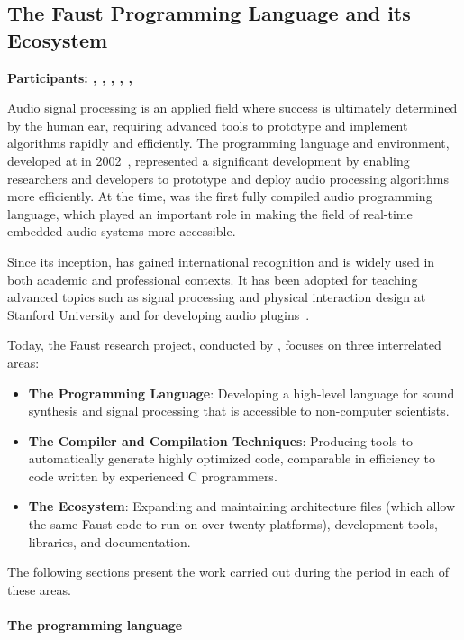 \subsection{The Faust Programming Language and its Ecosystem} {\bf Participants: \florent, \stephane, \romain,  \yann, \tanguy, \christine}


Audio signal processing is an applied field where success is ultimately determined by the human ear, requiring advanced tools to prototype and implement algorithms rapidly and efficiently. The \F{} programming language and environment, developed at \gramecncm in 2002~\cite{orlarey2002}, represented a significant development by enabling researchers and developers to prototype and deploy audio processing algorithms more efficiently. At the time, \F{} was the first fully compiled audio programming language, which played an important role in making the field of real-time embedded audio systems more accessible.  

Since its inception, \F{} has gained international recognition and is widely used in both academic and professional contexts. It has been adopted for teaching advanced topics such as signal processing and physical interaction design at Stanford University and for developing audio plugins~\cite{faustLibraries2019}.  

Today, the Faust research project, conducted by \projectname, focuses on three interrelated areas:  
\begin{itemize}
    \item \textbf{The Programming Language}: Developing a high-level language for sound synthesis and signal processing that is accessible to non-computer scientists.
    \item \textbf{The Compiler and Compilation Techniques}: Producing tools to automatically generate highly optimized code, comparable in efficiency to code written by experienced C programmers.
    \item \textbf{The Ecosystem}: Expanding and maintaining architecture files (which allow the same Faust code to run on over twenty platforms), development tools, libraries, and documentation.
\end{itemize}  

The following sections present the work carried out during the period in each of these areas.

\paragraph{The \F{} programming language}

